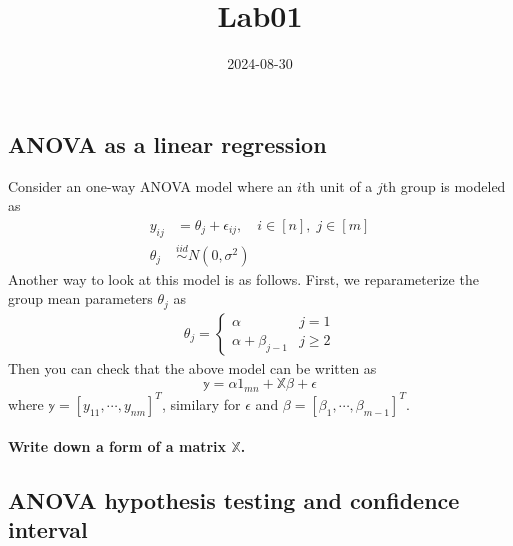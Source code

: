 \documentclass[
]{article}
\title{Lab01}
\author{}
\date{\vspace{-2.5em}2024-08-30}
\begin{document}
\maketitle

\subsection{ANOVA as a linear
regression}\label{anova-as-a-linear-regression}

Consider an one-way ANOVA model where an \(i\)th unit of a \(j\)th group
is modeled as \[
\begin{aligned}
y_{ij} &= \theta_j + \epsilon_{ij},\quad i\in[n],\;j\in[m]\\
\theta_j &\stackrel{iid}{\sim} N(0, \sigma^2)
\end{aligned}
\] Another way to look at this model is as follows. First, we
reparameterize the group mean parameters \(\theta_j\) as \[
\begin{aligned}
\theta_j = 
\begin{cases}
\alpha\quad &j=1\\
\alpha + \beta_{j-1}&j\geq 2
\end{cases}
\end{aligned}
\] Then you can check that the above model can be written as \[
\mathbb{y} = \alpha 1_{mn} + \mathbb{X}\beta + \mathbb{\epsilon}
\] where \(\mathbb{y} = [y_{11}, \cdots, y_{nm}]^T\), similary for
\(\mathbb{\epsilon}\) and \(\beta = [\beta_1, \cdots,\beta_{m-1}]^T\).

\paragraph{\texorpdfstring{Write down a form of a matrix
\(\mathbb{X}\).}{Write down a form of a matrix \textbackslash mathbb\{X\}.}}\label{write-down-a-form-of-a-matrix-mathbbx.}

\subsection{ANOVA hypothesis testing and confidence
interval}\label{anova-hypothesis-testing-and-confidence-interval}
\end{document}
